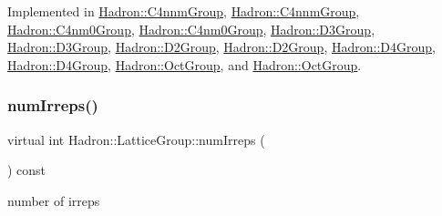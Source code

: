 Implemented in \mbox{\hyperlink{structHadron_1_1C4nnmGroup_afc1f011462142b5aa3ddab6e5824d365}{Hadron\+::\+C4nnm\+Group}}, \mbox{\hyperlink{structHadron_1_1C4nnmGroup_afc1f011462142b5aa3ddab6e5824d365}{Hadron\+::\+C4nnm\+Group}}, \mbox{\hyperlink{structHadron_1_1C4nm0Group_aefbae18f6b66563a061d607e680fcab7}{Hadron\+::\+C4nm0\+Group}}, \mbox{\hyperlink{structHadron_1_1C4nm0Group_aefbae18f6b66563a061d607e680fcab7}{Hadron\+::\+C4nm0\+Group}}, \mbox{\hyperlink{structHadron_1_1D3Group_a442d9bebc6eae854024be8123fda60d8}{Hadron\+::\+D3\+Group}}, \mbox{\hyperlink{structHadron_1_1D3Group_a442d9bebc6eae854024be8123fda60d8}{Hadron\+::\+D3\+Group}}, \mbox{\hyperlink{structHadron_1_1D2Group_a15d5aa6a889d3e0f27c3f2796d7157ae}{Hadron\+::\+D2\+Group}}, \mbox{\hyperlink{structHadron_1_1D2Group_a15d5aa6a889d3e0f27c3f2796d7157ae}{Hadron\+::\+D2\+Group}}, \mbox{\hyperlink{structHadron_1_1D4Group_a814de4e3ea523397868aee44d639c5cf}{Hadron\+::\+D4\+Group}}, \mbox{\hyperlink{structHadron_1_1D4Group_a814de4e3ea523397868aee44d639c5cf}{Hadron\+::\+D4\+Group}}, \mbox{\hyperlink{structHadron_1_1OctGroup_abc0b88d4a62fb81c996b6638827cc187}{Hadron\+::\+Oct\+Group}}, and \mbox{\hyperlink{structHadron_1_1OctGroup_abc0b88d4a62fb81c996b6638827cc187}{Hadron\+::\+Oct\+Group}}.

\mbox{\label{structHadron_1_1LatticeGroup_a3edaca488144b5d2a9cf73fe653add34}} 
\subsubsection{\texorpdfstring{numIrreps()}{numIrreps()}\hspace{0.1cm}{\footnotesize\ttfamily [1/2]}}
{\footnotesize\ttfamily virtual int Hadron\+::\+Lattice\+Group\+::num\+Irreps (\begin{DoxyParamCaption}{ }\end{DoxyParamCaption}) const\hspace{0.3cm}{\ttfamily [pure virtual]}}

number of irreps 

